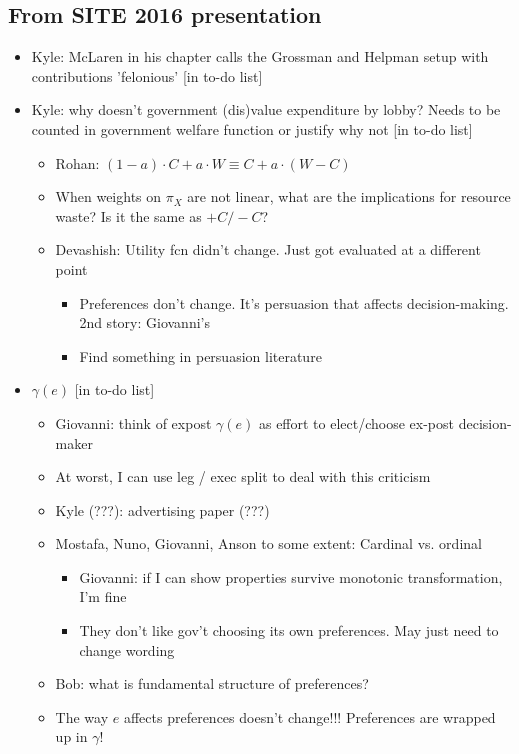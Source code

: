 \documentclass[12pt]{article}
\newcommand{\ga}{\gamma}
\begin{document}
\subsection{From SITE 2016 presentation}
\begin{itemize}
	\item Kyle: McLaren in his chapter calls the Grossman and Helpman setup with contributions 'felonious' [in to-do list]
	\item Kyle: why doesn't government (dis)value expenditure by lobby? Needs to be counted in government welfare function or justify why not [in to-do list]
		\begin{itemize}
			\item Rohan: $(1-a)\cdot C + a \cdot W \equiv C + a \cdot (W-C)$
			\item When weights on $\pi_X$ are not linear, what are the implications for resource waste? Is it the same as $+ C / - C$?
			\item Devashish: Utility fcn didn't change. Just got evaluated at a different point
				\begin{itemize}
					\item Preferences don't change. It's persuasion that affects decision-making. 2nd story: Giovanni's
					\item Find something in persuasion literature
				\end{itemize}
		\end{itemize}
	\item $\ga(e)$ [in to-do list]
		\begin{itemize}
			\item Giovanni: think of expost $\ga(e)$ as effort to elect/choose ex-post decision-maker
			\item At worst, I can use leg / exec split to deal with this criticism
			\item Kyle (???): advertising paper (???)
			\item Mostafa, Nuno, Giovanni, Anson to some extent: Cardinal vs. ordinal
				\begin{itemize}
					\item Giovanni: if I can show properties survive  monotonic transformation, I'm fine
					\item They don't like gov't choosing its own preferences. May just need to change wording
				\end{itemize}
			\item Bob: what is fundamental structure of preferences?
			\item The way $e$ affects preferences doesn't change!!! Preferences are wrapped up in $\ga$!

\end{itemize}
\end{itemize}
\end{document}
